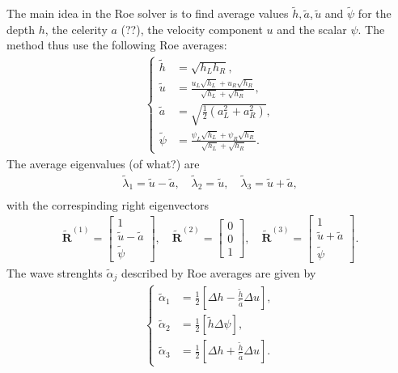 The main idea in the Roe solver is to find average values $\tilde{h}, \tilde{a}, \tilde{u}$ and $\tilde{\psi}$ for the depth $h$, the celerity $a$ (??), the velocity component $u$ and the scalar $\psi$.
The method thus use the following Roe averages:
\begin{align}\label{eq:Roe_averages}
    \left\{
\begin{aligned}
    \tilde{h} &= \sqrt{h_L h_R}, \\
    \tilde{u} &= \frac{u_L \sqrt{h_L} + u_R \sqrt{h_R}}{\sqrt{h_L} + \sqrt{h_R}}, \\
    \tilde{a} &= \sqrt{\frac{1}{2}(a_L^2 + a_R^2)}, \\
    \tilde{\psi} &= \frac{\psi_L \sqrt{h_L}  + \psi_R \sqrt{h_R}}{\sqrt{h_L} + \sqrt{h_R}}.
\end{aligned}
\right.
\end{align}
The average eigenvalues (of what?) are
\begin{align*}
    \tilde{\lambda}_1 = \tilde{u} - \tilde{a}, \quad \tilde{\lambda}_2 = \tilde{u}, \quad \tilde{\lambda}_3 = \tilde{u} + \tilde{a}, \\
\end{align*} 
with the correspinding right eigenvectors
\begin{align*}
    \tilde{\mathbf{R}}^{(1)} = \begin{bmatrix}
        1 \\ \tilde{u} - \tilde{a} \\ \tilde{\psi}
    \end{bmatrix}, \quad
    \tilde{\mathbf{R}}^{(2)} = \begin{bmatrix}
        0 \\ 0 \\  1
    \end{bmatrix}, \quad
    \tilde{\mathbf{R}}^{(3)} = \begin{bmatrix}
        1 \\ \tilde{u} + \tilde{a} \\ \tilde{\psi}
    \end{bmatrix}.
\end{align*}
The wave strenghts $\tilde{\alpha}_j$ described by Roe averages are given by
\begin{align}
    \left\{
    \begin{aligned}
        \tilde{\alpha}_1 &= \frac{1}{2} \left[ \Delta h - \frac{\tilde{h}}{\tilde{a}} \Delta u  \right], \\
        \tilde{\alpha}_2 &= \frac{1}{2} \left[ \tilde{h} \Delta \psi  \right], \\
        \tilde{\alpha}_3 &= \frac{1}{2} \left[ \Delta h + \frac{\tilde{h}}{\tilde{a}} \Delta u  \right].
    \end{aligned}    
    \right.
\end{align}

